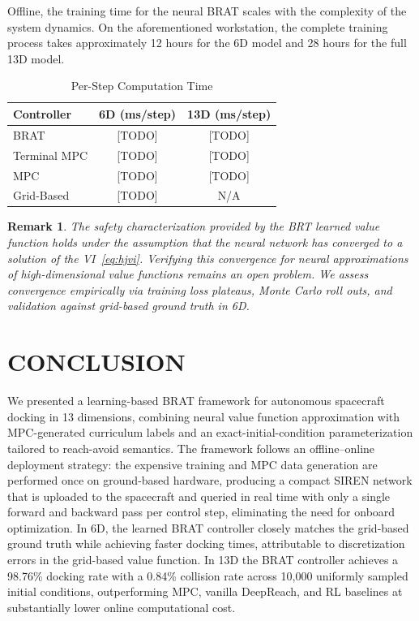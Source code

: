 \documentclass[letterpaper, 10 pt, conference]{ieeeconf}
\newtheorem{remark}{Remark}
\begin{document}
Offline, the training time for the neural BRAT scales with the complexity of the system dynamics. On the aforementioned workstation, the complete training process takes approximately 12 hours for the 6D model and 28 hours for the full 13D model.

\begin{table}[t]
\caption{Per-Step Computation Time}
\label{tab:timing}
\centering
\begin{tabular}{lcc}
\toprule
Controller & 6D (ms/step) & 13D (ms/step) \\
\midrule
BRAT & [TODO] & [TODO] \\
Terminal MPC & [TODO] & [TODO] \\
MPC & [TODO] & [TODO] \\
Grid-Based & [TODO] & N/A \\
\bottomrule
\end{tabular}
\end{table}

\begin{remark}
The safety characterization provided by the BRT learned value function holds under the assumption that the neural network has converged to a solution of the VI~\eqref{eq:hjvi}. Verifying this convergence for neural approximations of high-dimensional value functions remains an open problem. We assess convergence empirically via training loss plateaus, Monte Carlo roll outs, and validation against grid-based ground truth in 6D.
\end{remark}

\addtolength{\textheight}{-5cm}

\section{CONCLUSION}

We presented a learning-based BRAT framework for autonomous spacecraft docking in 13 dimensions, combining neural value function approximation with MPC-generated curriculum labels and an exact-initial-condition parameterization tailored to reach-avoid semantics. The framework follows an offline--online deployment strategy: the expensive training and MPC data generation are performed once on ground-based hardware, producing a compact SIREN network that is uploaded to the spacecraft and queried in real time with only a single forward and backward pass per control step, eliminating the need for onboard optimization. In 6D, the learned BRAT controller closely matches the grid-based ground truth while achieving faster docking times, attributable to discretization errors in the grid-based value function. In 13D the BRAT controller achieves a 98.76\% docking rate with a 0.84\% collision rate across 10{,}000 uniformly sampled initial conditions, outperforming MPC, vanilla DeepReach, and RL baselines at substantially lower online computational cost.
\end{document}
